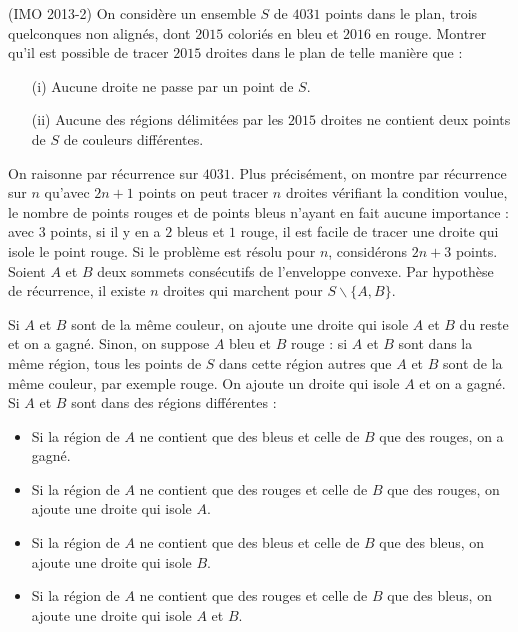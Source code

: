 \begin{exo} (IMO 2013-2)
On considère un ensemble $S$ de $4031$ points dans le plan, trois quelconques non alignés, dont $2015$ coloriés en bleu et $2016$ en rouge. Montrer qu'il est possible de tracer $2015$ droites dans le plan de telle manière que :
\begin{itemize}
\item[(i)]
Aucune droite ne passe par un point de $S$.
\item[(ii)]
Aucune des régions délimitées par les $2015$ droites ne contient deux points de $S$ de couleurs différentes.
\end{itemize}
\end{exo}

\begin{sol}
On raisonne par récurrence sur $4031$. Plus précisément, on montre par récurrence sur $n$ qu'avec $2n+1$ points on peut tracer $n$ droites vérifiant la condition voulue, le nombre de points rouges et de points bleus n'ayant en fait aucune importance : avec $3$ points, si il y en a $2$ bleus et $1$ rouge, il est facile de tracer une droite qui isole le point rouge. Si le problème est résolu pour $n$, considérons $2n+3$ points. Soient $A$ et $B$ deux sommets consécutifs de l'enveloppe convexe. Par hypothèse de récurrence, il existe $n$ droites qui marchent pour $S \backslash \{A,B\}$.

Si $A$ et $B$ sont de la même couleur, on ajoute une droite qui isole $A$ et $B$ du reste et on a gagné. Sinon, on suppose $A$ bleu et $B$ rouge : si $A$ et $B$ sont dans la même région, tous les points de $S$ dans cette région autres que $A$ et $B$ sont de la même couleur, par exemple rouge. On ajoute un droite qui isole $A$ et on a gagné. Si $A$ et $B$ sont dans des régions différentes :
\begin{itemize}
\item
Si la région de $A$ ne contient que des bleus et celle de $B$ que des rouges, on a gagné.
\item
Si la région de $A$ ne contient que des rouges et celle de $B$ que des rouges, on ajoute une droite qui isole $A$.
\item
Si la région de $A$ ne contient que des bleus et celle de $B$ que des bleus, on ajoute une droite qui isole $B$.
\item
Si la région de $A$ ne contient que des rouges et celle de $B$ que des bleus, on ajoute une droite qui isole $A$ et $B$.
\end{itemize}
\end{sol}

